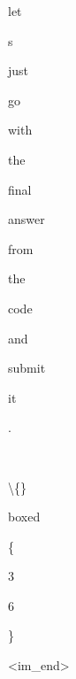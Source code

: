 \begin{figure}[p]
\begin{tcolorbox}
\colorbox{red!88}{\strut\scriptsize  let}\allowbreak\hspace{0pt}%
\colorbox{red!47}{\strut\scriptsize \textquotesingle{}s}\allowbreak\hspace{0pt}%
\colorbox{red!100}{\strut\scriptsize  just}\allowbreak\hspace{0pt}%
\colorbox{red!100}{\strut\scriptsize  go}\allowbreak\hspace{0pt}%
\colorbox{orange!53}{\strut\scriptsize  with}\allowbreak\hspace{0pt}%
\colorbox{red!95}{\strut\scriptsize  the}\allowbreak\hspace{0pt}%
\colorbox{red!100}{\strut\scriptsize  final}\allowbreak\hspace{0pt}%
\colorbox{red!89}{\strut\scriptsize  answer}\allowbreak\hspace{0pt}%
\colorbox{red!85}{\strut\scriptsize  from}\allowbreak\hspace{0pt}%
\colorbox{red!100}{\strut\scriptsize  the}\allowbreak\hspace{0pt}%
\colorbox{red!100}{\strut\scriptsize  code}\allowbreak\hspace{0pt}%
\colorbox{red!100}{\strut\scriptsize  and}\allowbreak\hspace{0pt}%
\colorbox{red!88}{\strut\scriptsize  submit}\allowbreak\hspace{0pt}%
\colorbox{red!92}{\strut\scriptsize  it}\allowbreak\hspace{0pt}%
\colorbox{red!76}{\strut\scriptsize .}\allowbreak\hspace{0pt}%
\colorbox{red!100}{\strut\scriptsize \,}\allowbreak\hspace{0pt}%
\colorbox{red!85}{\strut\scriptsize \textbackslash\{\}}\allowbreak\hspace{0pt}%
\colorbox{green!72}{\strut\scriptsize boxed}\allowbreak\hspace{0pt}%
\colorbox{red!60}{\strut\scriptsize \{}\allowbreak\hspace{0pt}%
\colorbox{red!78}{\strut\scriptsize 3}\allowbreak\hspace{0pt}%
\colorbox{red!55}{\strut\scriptsize 6}\allowbreak\hspace{0pt}%
\colorbox{red!90}{\strut\scriptsize \}}\allowbreak\hspace{0pt}%
\colorbox{red!68}{\strut\scriptsize {\textless}{\textbar}im\_end{\textbar}{\textgreater}}
\end{tcolorbox}



\label{fig:token_entropy_case_study}

\end{figure}
